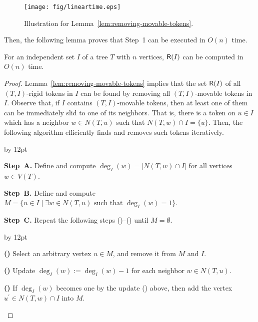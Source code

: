 \documentclass{llncs}
\newcommand{\Nei}[2]{N(#1,#2)}
\newcommand{\bfI}{I}
\newcommand{\ImSet}[1]{{\sf R}(\bfI_{#1})}
\newenvironment{listing}[1]{\begin{list}{*}{\settowidth{\labelwidth}{#1}\setlength{\leftmargin}{\labelwidth}\advance \leftmargin by 12pt
\setlength{\itemsep}{0pt}\setlength{\parsep}{0pt}\setlength{\topsep}{0pt}\setlength{\parskip}{0pt}}}{\end{list}}
\newcounter{one}
\newcommand{\one}{{\rm \roman{one}}}
\newcounter{two}
\newcommand{\two}{{\rm \roman{two}}}
\newcounter{three}
\newcommand{\three}{{\rm \roman{three}}}
\begin{document}
\begin{figure}[t]
\begin{center}
	\texttt{[image: fig/lineartime.eps]}
	\end{center}
	\vspace{-1em}
	\caption{Illustration for Lemma~\ref{lem:removing-movable-tokens}.}
	\label{fig:removing_movable_tokens}
\end{figure}

	Then, the following lemma proves that Step~1 can be executed in $O(n)$ time.  
	\begin{lemma} \label{lem:all-rigid-tokens}
	For an independent set $\bfI$ of a tree $T$ with $n$ vertices, $\ImSet{}$ can be computed in $O(n)$ time.
	\end{lemma}
	\begin{proof}
	Lemma~\ref{lem:removing-movable-tokens} implies that the set $\ImSet{}$ of all $(T, \bfI)$-rigid tokens in $\bfI$ can be found by removing all $(T, \bfI)$-movable tokens in $\bfI$.
	Observe that, if $\bfI$ contains $(T, \bfI)$-movable tokens, then at least one of them can be immediately slid to one of its neighbors.
	That is, there is a token on $u \in \bfI$ which has a neighbor $w \in \Nei{T}{u}$ such that $\Nei{T}{w} \cap \bfI = \{u\}$.
	Then, the following algorithm efficiently finds and removes such tokens iteratively.
	\smallskip

	\begin{listing}{{\bf Step~B.}}
	\item[{\bf Step~A.}] Define and compute $\deg_{\bfI}(w) = |\Nei{T}{w} \cap \bfI|$ for all vertices $w \in V(T)$.
	\smallskip

	\item[{\bf Step~B.}] Define and compute $M = \{u \in \bfI \mid \exists w \in \Nei{T}{u} \mbox{ such that }\deg_{\bfI}(w) = 1\}$.
	\smallskip
	       
	\item[{\bf Step~C.}] Repeat the following steps (\one)--(\three) until $M = \emptyset$.
		\begin{listing}{{\bf (\three)}}
		\item[{\bf (\one)}] Select an arbitrary vertex $u \in M$, and remove it from $M$ and $\bfI$.
		\item[{\bf (\two)}] Update $\deg_{\bfI}(w) := \deg_{\bfI}(w) - 1$ for each neighbor $w \in \Nei{T}{u}$.
		\item[{\bf (\three)}]  If $\deg_{\bfI}(w)$ becomes one by the update (\two) above, then add the vertex $u^\prime \in \Nei{T}{w} \cap \bfI$ into $M$.
		\end{listing}
  \smallskip


\end{listing}
\end{proof}
\end{document}
